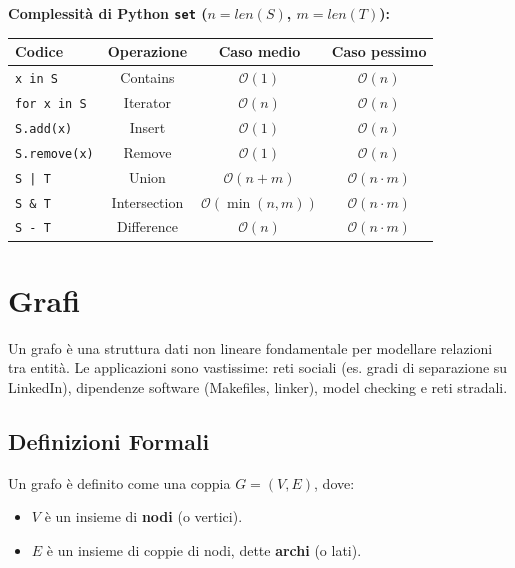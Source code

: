\documentclass[12pt, a4paper]{article}
\begin{document}
\textbf{Complessità di Python \texttt{set} ($n = len(S)$, $m = len(T)$):}
\begin{table}[H]
\centering
\begin{tabular}{@{}lccc@{}}
\toprule
\textbf{Codice} & \textbf{Operazione} & \textbf{Caso medio} & \textbf{Caso pessimo} \\ \midrule

\texttt{x in S} & Contains & $\mathcal{O}(1)$ & $\mathcal{O}(n)$ \\

\texttt{for x in S} & Iterator & $\mathcal{O}(n)$ & $\mathcal{O}(n)$ \\

\texttt{S.add(x)} & Insert & $\mathcal{O}(1)$ & $\mathcal{O}(n)$ \\

\texttt{S.remove(x)} & Remove & $\mathcal{O}(1)$ & $\mathcal{O}(n)$ \\

\texttt{S | T} & Union & $\mathcal{O}(n+m)$ & $\mathcal{O}(n \cdot m)$ \\

\texttt{S \& T} & Intersection & $\mathcal{O}(\min(n,m))$ & $\mathcal{O}(n \cdot m)$ \\

\texttt{S - T} & Difference & $\mathcal{O}(n)$ & $\mathcal{O}(n \cdot m)$ \\

\bottomrule
\end{tabular}
\end{table}


\section{Grafi}

Un grafo è una struttura dati non lineare fondamentale per modellare relazioni tra entità. Le applicazioni sono vastissime: reti sociali (es. gradi di separazione su LinkedIn), dipendenze software (Makefiles, linker), model checking e reti stradali.

\subsection{Definizioni Formali}
Un grafo è definito come una coppia $G = (V, E)$, dove:
\begin{itemize}
\item $V$ è un insieme di \textbf{nodi} (o vertici).
\item $E$ è un insieme di coppie di nodi, dette \textbf{archi} (o lati).
\end{itemize}
\end{document}
